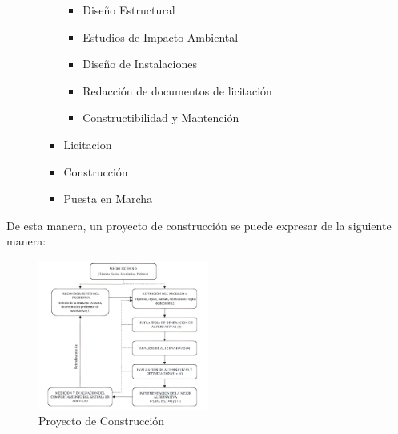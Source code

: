 \documentclass{article} %
\begin{document}
\begin{itemize}[label={},left=0pt,align=parleft]
\begin{itemize}[label={},left=1em,align=parleft]
\begin{itemize}[label={},left=2em,align=parleft]
\begin{itemize}[label={},left=3em,align=parleft]
                \item \begin{highlightbox}[levelfour] Diseño Estructural \end{highlightbox}
                \item \begin{highlightbox}[levelfour] Estudios de Impacto Ambiental \end{highlightbox}
                \item \begin{highlightbox}[levelfour] Diseño de Instalaciones \end{highlightbox}
                \item \begin{highlightbox}[levelfour] Redacción de documentos de licitación \end{highlightbox}
                \item \begin{highlightbox}[levelfour] Constructibilidad y Mantención \end{highlightbox}
            \end{itemize}
            \item \begin{highlightbox}[levelthree] Licitacion \end{highlightbox}
            \item \begin{highlightbox}[levelthree] Construcción \end{highlightbox}
            \item \begin{highlightbox}[levelthree] Puesta en Marcha \end{highlightbox}
        \end{itemize}
    \end{itemize}
\end{itemize}

De esta manera, un proyecto de construcción se puede expresar de la siguiente manera:

\begin{figure}[H]
    \centering
    \includegraphics[width=0.5\textwidth]{proyecto_construccion.png}
    \caption{Proyecto de Construcción}
    \label{fig:ProyectoConstruccion}
\end{figure}
\end{document}
